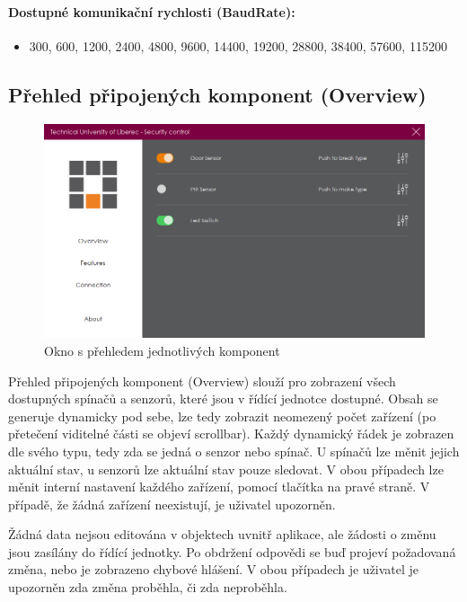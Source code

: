 \documentclass[FM,DP]{tulthesis}  %
\begin{document}
\paragraph{Dostupné komunikační rychlosti (BaudRate):}
\begin{itemize}
\item 300, 600, 1200, 2400, 4800, 9600, 14400, 19200, 28800, 38400, 57600, 115200
\end{itemize} 

\subsection{Přehled připojených komponent (Overview)}

\begin{figure}[H]
\begin{center}
\includegraphics[width=\textwidth]{images/overview.png}
\caption{Okno s přehledem jednotlivých komponent}
\label{image}
\end{center}
\end{figure}

Přehled připojených komponent (Overview) slouží pro zobrazení všech dostupných spínačů a senzorů, které jsou v řídící jednotce dostupné. Obsah se generuje dynamicky pod sebe, lze tedy zobrazit neomezený počet zařízení (po přetečení viditelné části se objeví scrollbar). Každý dynamický řádek je zobrazen dle svého typu, tedy zda se jedná o senzor nebo spínač. U spínačů lze měnit jejich aktuální stav, u senzorů lze aktuální stav pouze sledovat. V obou případech lze měnit interní nastavení každého zařízení, pomocí tlačítka na pravé straně. V případě, že žádná zařízení neexistují, je uživatel upozorněn. 

Žádná data nejsou editována v objektech uvnitř aplikace, ale žádosti o změnu jsou zasílány do řídící jednotky. Po obdržení odpovědi se buď projeví požadovaná změna, nebo je zobrazeno chybové hlášení. V obou případech je uživatel je upozorněn zda změna proběhla, či zda neproběhla.
\end{document}
